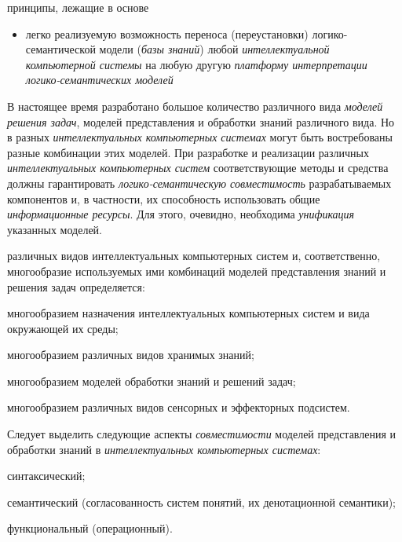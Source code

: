 \begin{SCn}
\begin{scnrelfromlistcustom}{принципы, лежащие в основе}
{\begin{itemize}[labelsep=\tabsize-\bulletsize,leftmargin=\tabsize,label=$\bullet$]
				\item легко реализуемую возможность переноса (переустановки) логико-семантической модели (\textit{базы знаний}) любой \textit{интеллектуальной компьютерной системы} на любую другую \textit{платформу интерпретации логико-семантических моделей}
				\end{itemize}
		}	
		
	\end{scnrelfromlistcustom}
\end{SCn}

В настоящее время разработано большое количество различного вида \textit{моделей решения задач}, моделей представления и обработки знаний различного вида. Но в разных \textit{интеллектуальных компьютерных системах} могут быть востребованы разные комбинации этих моделей. При разработке и реализации различных \textit{интеллектуальных компьютерных систем} соответствующие методы и средства должны гарантировать \textit{логико-семантическую совместимость} разрабатываемых компонентов и, в частности, их способность использовать общие \textit{информационные ресурсы}. Для этого, очевидно, необходима \textit{унификация} указанных моделей.

 различных видов интеллектуальных компьютерных систем и, соответственно, многообразие используемых ими комбинаций моделей представления знаний и решения задач определяется:
\begin{textitemize}
	\item многообразием назначения интеллектуальных компьютерных систем и вида окружающей их среды;
	\item многообразием различных видов хранимых знаний;
	\item многообразием моделей обработки знаний и решений задач;
	\item многообразием различных видов сенсорных и эффекторных подсистем.
\end{textitemize}

Следует выделить следующие аспекты \textit{совместимости} моделей представления и обработки знаний в \textit{интеллектуальных компьютерных системах}:

\begin{textitemize}
	\item синтаксический;
	\item семантический (согласованность систем понятий, их денотационной семантики);
	\item функциональный (операционный).
\end{textitemize}

